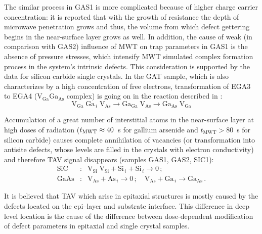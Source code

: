 \documentclass[10pt]{iopart}
\begin{document}
The similar process in GAS1 is more complicated because of higher charge carrier concentration:
it is reported \cite{ZOHM2000} that with the growth of resistance the depth of microwave penetration grows
and thus, the volume from which defect gettering begins in the near-surface layer grows as well.
In addition, the cause of weak (in comparison with GAS2) influence of MWT on trap parameters in GAS1 is the absence of pressure stresses,
which intensify MWT simulated complex formation process in the system’s intrinsic defects.
This consideration is supported by the data for silicon carbide single crystals.
In the GAT sample, which is also characterizes by a high concentration of free electrons,
transformation of EGA3 to EGA4 (V$_\mathrm{Ga}$Ga$_\mathrm{As}$ complex) is going on in the reaction described in \cite{FANG1990}:
\begin{equation*}
  \mathrm{V}_\mathrm{Ga}\;\mathrm{Ga}_{\,i}\;\mathrm{V}_\mathrm{As}\rightarrow \mathrm{Ga}_\mathrm{Ga}\;\mathrm{V}_\mathrm{As}
  \rightarrow \mathrm{Ga}_\mathrm{As}\;\mathrm{V}_\mathrm{Ga}
\end{equation*}

Accumulation of a great number of interstitial atoms in the near-surface layer at high doses of radiation
($t_{\rm MWT}\approx40$~s for gallium arsenide and $t_\mathrm{MWT}>80$~s for silicon carbide)
causes complete annihilation of vacancies (or transformation into antisite defects, whose levels are filled in the crystals with electron conductivity)
 and therefore TAV signal disappears (samples GAS1, GAS2, SIC1):
\begin{eqnarray}
  \nonumber
  \mathrm{SiC}&:&\mathrm{V}_\mathrm{Si}\;\mathrm{V}_\mathrm{Si}+\mathrm{Si}_{\,i}+ \mathrm{Si}_{\,i} \rightarrow 0\,;\\
  \nonumber
  \mathrm{GaAs}&:&\mathrm{V}_\mathrm{As}+\mathrm{As}_{\,i} \rightarrow 0\,;\quad
  \mathrm{V}_\mathrm{As}+\mathrm{Ga}_{\,i} \rightarrow \mathrm{Ga}_\mathrm{As}\,.
\end{eqnarray}

It is believed \cite{OstrovskiiSST,OlikhSSC,OstrovPAN} that TAV
which arise in epitaxial structures
is mostly caused by the defects located on the epi--layer and substrate interface.
This difference in deep level location
is the cause of the difference between dose-dependent modification of defect parameters in epitaxial and single crystal samples.
\end{document}
